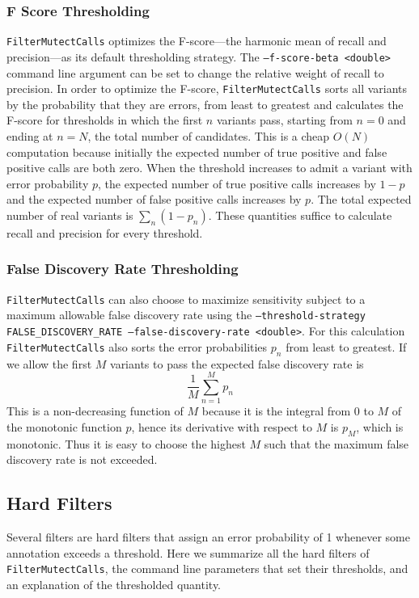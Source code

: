 \documentclass[nofootinbib,amssymb,amsmath]{revtex4}
\newcommand{\code}[1]{\texttt{#1}}
\begin{document}
\subsubsection{F Score Thresholding}
\code{FilterMutectCalls} optimizes the F-score---the harmonic mean of recall and precision---as its default thresholding strategy.  The \code{--f-score-beta <double>} command line argument can be set to change the relative weight of recall to precision.  In order to optimize the F-score, \code{FilterMutectCalls} sorts all variants by the probability that they are errors, from least to greatest and calculates the F-score for thresholds in which the first $n$ variants pass, starting from $n = 0$ and ending at $n = N$, the total number of candidates.  This is a cheap $O(N)$ computation because initially the expected number of true positive and false positive calls are both zero.  When the threshold increases to admit a variant with error probability $p$, the expected number of true positive calls increases by $1 - p$ and the expected number of false positive calls increases by $p$.  The total expected number of real variants is $\sum_n (1 - p_n)$.  These quantities suffice to calculate recall and precision for every threshold.

\subsubsection{False Discovery Rate Thresholding}
\code{FilterMutectCalls} can also choose to maximize sensitivity subject to a maximum allowable false discovery rate using the \code{--threshold-strategy FALSE\_DISCOVERY\_RATE --false-discovery-rate <double>}.  For this calculation \code{FilterMutectCalls} also sorts the error probabilities $p_n$ from least to greatest.  If we allow the first $M$ variants to pass the expected false discovery rate is
\begin{equation}
\frac{1}{M} \sum_{n = 1}^{M} p_n
\end{equation}
This is a non-decreasing function of $M$ because it is the integral from $0$ to $M$ of the monotonic function $p$, hence its derivative with respect to $M$ is $p_M$, which is monotonic.  Thus it is easy to choose the highest $M$ such that the maximum false discovery rate is not exceeded.

\subsection{Hard Filters}
Several filters are hard filters that assign an error probability of 1 whenever some annotation exceeds a threshold.  Here we summarize all the hard filters of \code{FilterMutectCalls}, the command line parameters that set their thresholds, and an explanation of the thresholded quantity.
\end{document}
